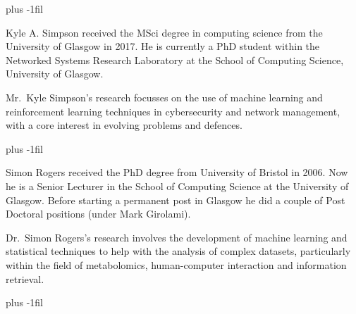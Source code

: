 \documentclass[10pt, times, comsoc]{IEEEtran}
\begin{document}
\renewcommand*{\bibfont}{\footnotesize}
\printbibliography
\vspace{-1.1cm}
\vskip -6pt plus -1fil
\begin{IEEEbiography}
	{Kyle A. Simpson}
	received the MSci degree in computing science from the University of Glasgow in 2017.
	He is currently a PhD student within the Networked Systems Research Laboratory at the School of Computing Science, University of Glasgow.
	
	Mr.\ Kyle Simpson's research focusses on the use of machine learning and reinforcement learning techniques in cybersecurity and network management, with a core interest in evolving problems and defences.
\end{IEEEbiography}
\vspace{-1.1cm}
\vskip 0pt plus -1fil
\begin{IEEEbiography}
	{Simon Rogers}
	received the PhD degree from University of Bristol in 2006. Now he is a Senior Lecturer in the School of Computing Science at the University of Glasgow. Before starting a permanent post in Glasgow he did a couple of Post Doctoral positions (under Mark Girolami).
	
	Dr.\ Simon Rogers’s research involves the development of machine learning and statistical techniques to help with the analysis of complex datasets, particularly within the field of metabolomics, human-computer interaction and information retrieval.
\end{IEEEbiography}
\vspace{-1.1cm}
\vskip 0pt plus -1fil
\end{document}
